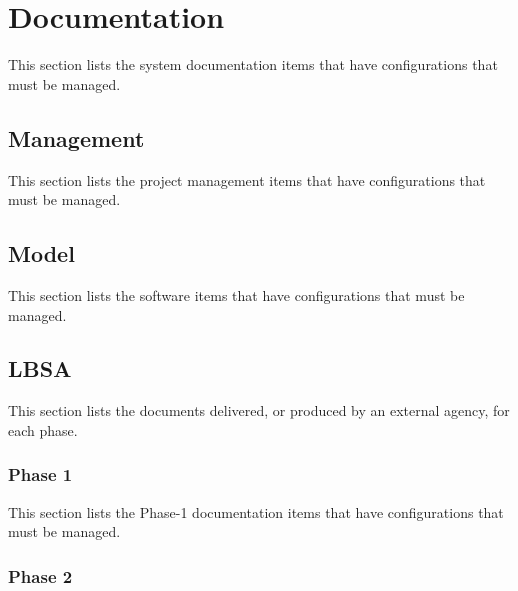 
\section{Documentation}
\label{loc:CI_Documentation}

This section lists the system documentation items that have configurations that must be managed.

\subsection{Management}
\label{loc:CI_System_Management}

This section lists the project management items that have configurations that must be managed.

\subsection{Model}
\label{loc:CI_System_Model}

This section lists the software items that have configurations that must be managed.


\subsection{LBSA}
\label{loc:CI_Docs_LBSA}

This section lists the documents delivered, or produced by an external agency, for each \LBSA phase.

\subsubsection{Phase 1}
\label{loc:CI_Docs_LBSA_Phase1}

This section lists the \CDS \LBSA Phase-1 documentation items that have configurations that must be managed.

\subsubsection{Phase 2}
\label{loc:CI_Docs_LBSA_Phase2}

